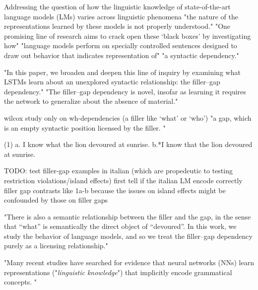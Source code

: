 




Addressing the question of how the linguistic knowledge of state-of-the-art language models (LMs) varies across linguistic phenomena \citep{warstadt2020blimp}
"the nature of the representations learned by these models is not properly understood." \citep{wilcox2018rnn}
"One promising line of research aims to crack open these ‘black boxes’ by investigating how" "language models perform on specially controlled sentences designed to draw out behavior that indicates representation of" "a syntactic dependency." \citep{wilcox2018rnn}

"In this paper, we broaden and deepen this line of inquiry by examining what LSTMs learn about
an unexplored syntactic relationship: the filler–gap dependency." \citep{wilcox2018rnn}
"The filler–gap dependency is novel, insofar as learning it requires the network to generalize about the absence of material." \citep{wilcox2018rnn}

wilcox study only on wh-dependencies (a filler like ‘what’ or ‘who’)
"a gap, which is an empty syntactic position licensed by the filler. "

(1) a. I know what the lion devoured at sunrise.
b.*I know that the lion devoured at sunrise.

TODO: test filler-gap examples in italian (which are propedeutic to testing restriction violations/island effects)
first tell if the italian LM encode correctly filler gap contrasts like 1a-b
because the issues on island effects might be confounded by those on filler gaps

"There is also a semantic relationship between the filler and the gap, in the sense that “what” is semantically the direct object of “devoured”. In this work, we study the behavior of language models, and so we treat the filler–gap dependency purely as a licensing relationship." \citep{wilcox2018rnn}

"Many recent studies have searched for evidence that neural networks (NNs) learn representations ("\textit{linguistic knowledge}") that implicitly encode grammatical concepts. "  \citep{warstadt2020blimp}

